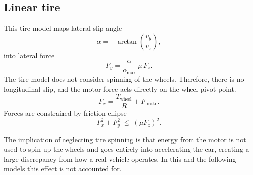 \subsection{Linear tire}
\label{linearTire}
This tire model maps lateral slip angle
\begin{equation}
    \alpha = -\arctan\!\left(\frac{v_y}{v_x}\right),
    \label{eq:slip_angle}
\end{equation}
into lateral force
\begin{equation}
    F_y = \frac{\alpha}{\alpha_\text{max}}\,\mu\,F_z.
    \label{eq:linear_tire_lat}
\end{equation}
The tire model does not consider spinning of the wheels. Therefore, there is no longitudinal slip, and the motor force acts directly on the wheel pivot point.
\begin{equation}
    F_x = \frac{T_\text{wheel}}{R} + F_\text{brake}.
    \label{eq:linear_tire_lon}
\end{equation}
Forces are constrained by friction ellipse
\begin{equation}
    F_x^2 + F_y^2 \;\leq\; (\mu F_z)^2.
    \label{eq:friction_circle}
\end{equation}

The implication of neglecting tire spinning is that energy from the motor is not used to spin up the wheels and goes entirely into accelerating the car, creating a large discrepancy from how a real vehicle operates. In this and the following models this effect is not accounted for.
